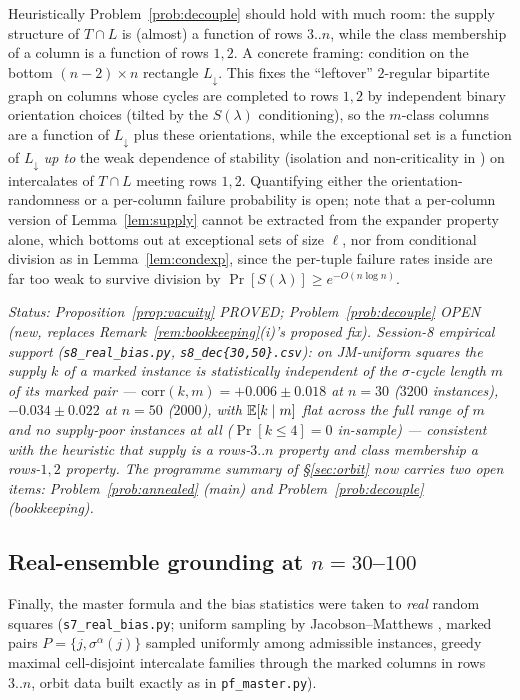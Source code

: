 Heuristically Problem~\ref{prob:decouple} should hold with much
room: the supply structure of $T\cap L$ is (almost) a function of
rows $3..n$, while the class membership of a column is a function of
rows $1,2$.  A concrete framing: condition on the bottom
$(n-2)\times n$ rectangle $L_\downarrow$.  This fixes the
``leftover'' $2$-regular bipartite graph on columns whose cycles are
completed to rows $1,2$ by independent binary orientation choices
(tilted by the $S(\lambda)$ conditioning), so the $m$-class columns
are a function of $L_\downarrow$ plus these orientations, while the
exceptional set is a function of $L_\downarrow$ \emph{up to} the
weak dependence of stability (isolation and non-criticality in
\cite[\S7]{KPS25}) on intercalates of $T\cap L$ meeting rows $1,2$.
Quantifying either the orientation-randomness or a per-column
failure probability is open; note that a per-column version of
Lemma~\ref{lem:supply} cannot be extracted from the expander
property alone, which bottoms out at exceptional sets of size
$\ell$, nor from conditional division as in
Lemma~\ref{lem:condexp}, since the per-tuple failure rates inside
\cite[Lem.~8.3]{KPS25} are far too weak to survive division by
$\Pr[S(\lambda)]\ge e^{-O(n\log n)}$.

\emph{Status: Proposition~\ref{prop:vacuity} PROVED;
Problem~\ref{prob:decouple} OPEN (new, replaces
Remark~\ref{rem:bookkeeping}(i)'s proposed fix).  Session-8 empirical
support (\texttt{s8\_real\_bias.py}, \texttt{s8\_dec\{30,50\}.csv}):
on JM-uniform squares the supply $k$ of a marked instance is
statistically independent of the $\sigma$-cycle length $m$ of its
marked pair --- $\mathrm{corr}(k,m)=+0.006\pm0.018$ at $n=30$
($3200$ instances), $-0.034\pm0.022$ at $n=50$ ($2000$), with
$\mathbb{E}[k\mid m]$ flat across the full range of $m$ and no supply-poor
instances at all ($\Pr[k\le4]=0$ in-sample) --- consistent with the
heuristic that supply is a rows-$3..n$ property and class membership
a rows-$1,2$ property.  The programme
summary of \S\ref{sec:orbit} now carries two open items:
Problem~\ref{prob:annealed} (main) and Problem~\ref{prob:decouple}
(bookkeeping).}

\subsection{Real-ensemble grounding at \texorpdfstring{$n=30$--$100$}
{n=30-100}}\label{sec:realbias}

Finally, the master formula and the bias statistics were taken to
\emph{real} random squares (\texttt{s7\_real\_bias.py}; uniform
sampling by Jacobson--Matthews \cite{JM96}, marked pairs
$P=\{j,\sigma^\alpha(j)\}$ sampled uniformly among admissible
instances, greedy maximal cell-disjoint intercalate families through
the marked columns in rows $3..n$, orbit data built exactly as in
\texttt{pf\_master.py}).


